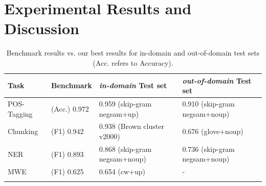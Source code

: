 \section{Experimental Results and Discussion}

\begin{table}
\caption{Benchmark results vs. our best results for in-domain and out-of-domain test sets (Acc. refers to Accuracy).}
\begin{center}
\begin{small}
\begin{tabular}{llll}
\hline
\textbf{Task} & \textbf{Benchmark} & \textbf{\textit{in-domain} Test set} & \textbf{\textit{out-of-domain} Test set} \\ \hline
POS-Tagging & (Acc.) 0.972 \cite{Toutanova:2003} & 0.959 (skip-gram negsam+up) & 0.910 (skip-gram negsam+noup)\\ 
Chunking & (F1) 0.942 \cite{Sha:2003} & 0.938 (Brown cluster v2000) & 0.676 (glove+noup)\\  
NER & (F1) 0.893 \cite{Ando:2005} & 0.868 (skip-gram negsam+noup) & 0.736 (skip-gram negsam+noup) \\  
MWE & (F1) 0.625 \cite{Schneider+:2014} & 0.654 (cw+up) & - \\ 
\hline
\label{benchmark}
\end{tabular}
\end{small}
\end{center}
\end{table}

